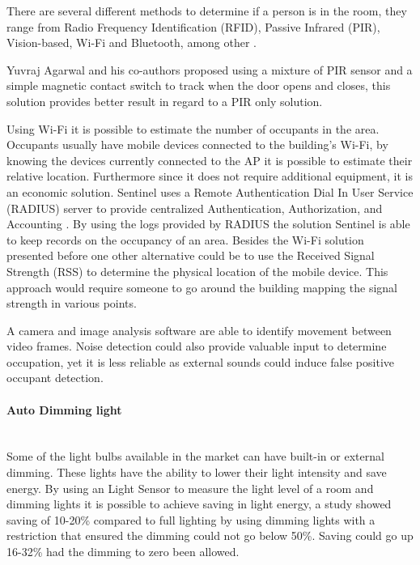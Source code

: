 There are several different methods to determine if a person is in the room, they range from Radio Frequency Identification (RFID), Passive Infrared (PIR), Vision-based, Wi-Fi and Bluetooth, among other \cite{ocupancy3}.

Yuvraj Agarwal and his co-authors proposed using a mixture of PIR sensor and a simple magnetic contact switch to track when the door opens and closes, this solution provides better result in regard to a PIR only solution\cite{ocupancy1}.

Using Wi-Fi it is possible to estimate the number of occupants in the area. Occupants usually have mobile devices connected to the building's Wi-Fi, by knowing the devices currently connected to the AP it is possible to estimate their relative location. Furthermore since it does not require additional equipment, it is an economic solution.
Sentinel uses a Remote Authentication Dial In User Service (RADIUS) server to provide centralized Authentication, Authorization, and Accounting \cite{wifi_ocupancy}. By using the logs provided by RADIUS the solution Sentinel is able to keep records on the occupancy of an area. 
Besides the Wi-Fi solution presented before one other alternative could be to use the Received Signal Strength (RSS) to determine the physical location of the mobile device\cite{wifi_ocupancy2}. This approach would require someone to go around the building mapping the signal strength in various points.

A camera and image analysis software are able to identify movement between video frames. Noise detection could also provide valuable input to determine occupation, yet it is less reliable as external sounds could induce false positive occupant detection.

\paragraph{Auto Dimming light}\mbox{}\\

Some of the light bulbs available in the market can have built-in or external dimming. These lights have the ability to lower their light intensity and save energy.
By using an Light Sensor to measure the light level of a room and dimming lights it is possible to achieve saving in light energy, a study \cite{sensor_app_lights} showed saving of 10-20\% compared to full lighting by using dimming lights with a restriction that ensured the dimming could not go below 50\%. Saving could go up 16-32\% had the dimming to zero been allowed.


